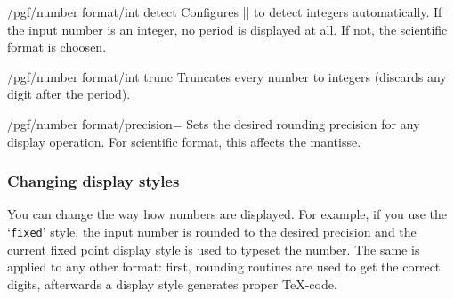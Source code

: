 {\begin{key}{/pgf/number format/int detect}
Configures |\pgfmathprintnumber| to detect integers automatically. If the input number is an integer, no period is displayed at all. If not, the scientific format is choosen.

\begin{codeexample}[]
\hspace{1em}
\hspace{1em}
\hspace{1em}
\hspace{1em}
\end{codeexample}
\end{key}

\begin{key}{/pgf/number format/int trunc}
Truncates every number to integers (discards any digit after the period).

\begin{codeexample}[]
\hspace{1em}
\hspace{1em}
\hspace{1em}
\hspace{1em}
\end{codeexample}
\end{key}

\begin{key}{/pgf/number format/precision=}
Sets the desired rounding precision for any display operation. For scientific format, this affects the mantisse.
\end{key}

\subsubsection{Changing display styles}%
\label{sec:number:styles}%
You can change the way how numbers are displayed. For example, if you use the `\texttt{fixed}' style, the input number is rounded to the desired precision and the current fixed point display style is used to typeset the number. The same is applied to any other format: first, rounding routines are used to get the correct digits, afterwards a display style generates proper \TeX-code.

}
